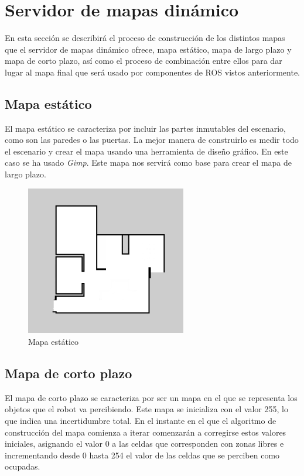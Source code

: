 \section{Servidor de mapas dinámico}
\label{cap:sevidordemapasdinamico}

En esta sección se describirá el proceso de construcción de los distintos mapas que el servidor de mapas dinámico ofrece, mapa estático, mapa de largo plazo y mapa de corto plazo, así como el proceso de combinación entre ellos para dar lugar al mapa final que será usado por componentes de ROS vistos anteriormente.

\subsection{Mapa estático}
El mapa estático se caracteriza por incluir las partes inmutables del escenario, como son las paredes o las puertas. La mejor manera de construirlo es medir todo el escenario y crear el mapa usando una herramienta de diseño gráfico. En este caso se ha usado \textit{Gimp}.
Este mapa nos servirá como base para crear el mapa de largo plazo.

\begin{figure} [H]
  \begin{center}
    \includegraphics[width=7cm]{img/cap5/mapaestatico}
  \end{center}
  \caption{Mapa estático}
  \label{fig:mapaestatico}
\end{figure}

\subsection{Mapa de corto plazo}
El mapa de corto plazo se caracteriza por ser un mapa en el que se representa los objetos que el robot va percibiendo. Este mapa se inicializa con el valor 255, lo que indica una incertidumbre total. En el instante en el que el algoritmo de construcción del mapa comienza a iterar comenzarán a corregirse estos valores iniciales, asignando el valor 0 a las celdas que corresponden con zonas libres e incrementando desde 0 hasta 254 el valor de las celdas que se perciben como ocupadas.

